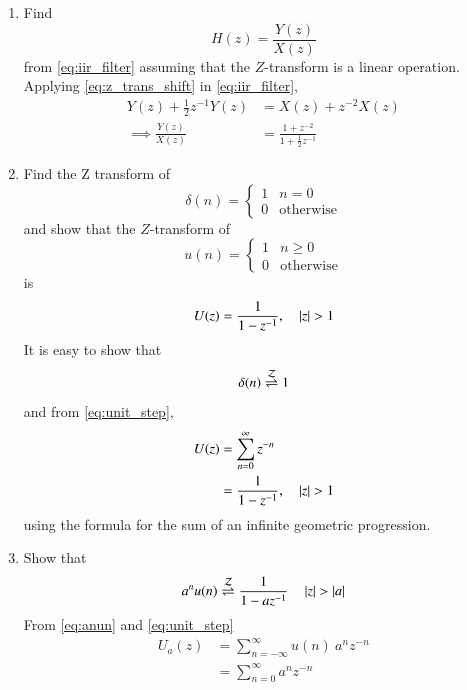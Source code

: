 \documentclass[journal,12pt,twocolumn]{IEEEtran}
\renewcommand\thesection{\arabic{section}}
\begin{document}
\begin{enumerate}[label=\thesection.\arabic*]
\item Find
%
\begin{equation}
H(z) = \frac{Y(z)}{X(z)}
\end{equation}
%
from  \eqref{eq:iir_filter} assuming that the $Z$-transform is a linear operation.
\\
\solution  Applying \eqref{eq:z_trans_shift} in \eqref{eq:iir_filter},
\begin{align}
Y(z) + \frac{1}{2}z^{-1}Y(z) &= X(z)+z^{-2}X(z)
\\
\implies \frac{Y(z)}{X(z)} &= \frac{1 + z^{-2}}{1 + \frac{1}{2}z^{-1}}
\label{eq:freq_resp}
\end{align}
%
\item Find the Z transform of 
\begin{equation}
\delta(n)
=
\begin{cases}
1 & n = 0
\\
0 & \text{otherwise}
\end{cases}
\end{equation}
and show that the $Z$-transform of
\begin{equation}
\label{eq:unit_step}
u(n)
=
\begin{cases}
1 & n \ge 0
\\
0 & \text{otherwise}
\end{cases}
\end{equation}
is
\begin{equation}
U(z) = \frac{1}{1-z^{-1}}, \quad \left\vert z\right\vert > 1
\end{equation}
\solution It is easy to show that
\begin{equation}
\delta(n) \overset{\mathcal{Z}}{ \rightleftharpoons} 1
\end{equation}
and from \eqref{eq:unit_step},
\begin{align}
U(z) &= \sum _{n= 0}^{\infty}z^{-n}
\\
&=\frac{1}{1-z^{-1}}, \quad \left\vert z\right\vert > 1
\end{align}
using the formula for the sum of an infinite geometric progression.
%
\item Show that 
\begin{equation}
\label{eq:anun}
a^nu(n) \overset{\mathcal{Z}}{ \rightleftharpoons} \frac{1}{1-az^{-1}} \quad \left\vert z\right\vert > \left\vert a\right\vert
\end{equation}
%
\solution From \eqref{eq:anun} and \eqref{eq:unit_step}
\begin{align}
U_{a}(z) &= \sum _{n= -\infty}^{\infty}u(n)\:a^{n}z^{-n}
\\
&= \sum _{n= 0}^{\infty}a^{n}z^{-n}
\\

\end{align}
\end{enumerate}
\end{document}

